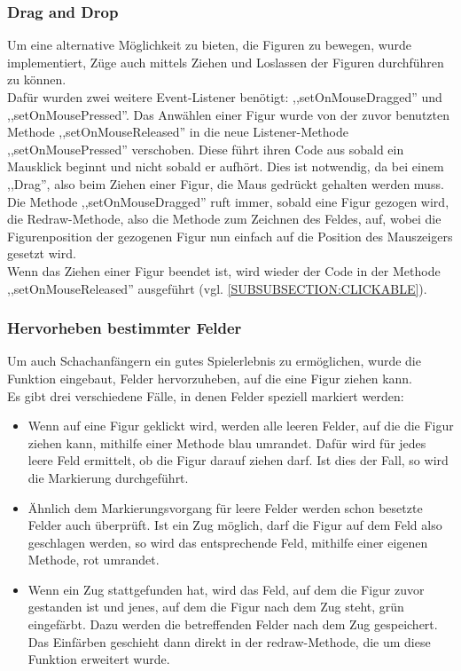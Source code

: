 \documentclass[12pt,a4paper]{article}
\begin{document}
\subsubsection{Drag and Drop}
\label{SUBSUBSECTION:DRAGANDDROP}
Um eine alternative Möglichkeit zu bieten, die Figuren zu bewegen, wurde implementiert, Züge auch mittels Ziehen und Loslassen der Figuren durchführen zu können.\\
Dafür wurden zwei weitere Event-Listener benötigt: ,,setOnMouseDragged'' und \\ ,,setOnMousePressed''. Das Anwählen einer Figur wurde von der zuvor benutzten Methode ,,setOnMouseReleased'' in die neue Listener-Methode ,,setOnMousePressed'' verschoben. Diese führt ihren Code aus sobald ein Mausklick beginnt und nicht sobald er aufhört. Dies ist notwendig, da bei einem ,,Drag'', also beim Ziehen einer Figur, die Maus gedrückt gehalten werden muss.\\
Die Methode ,,setOnMouseDragged'' ruft immer, sobald eine Figur gezogen wird, die Redraw-Methode, also die Methode zum Zeichnen des Feldes, auf, wobei die Figurenposition der gezogenen Figur nun einfach auf die Position des Mauszeigers gesetzt wird.\\
Wenn das Ziehen einer Figur beendet ist, wird wieder der Code in der Methode ,,setOnMouseReleased'' ausgeführt (vgl. \ref{SUBSUBSECTION:CLICKABLE}).


\subsubsection{Hervorheben bestimmter Felder}
\label{SUBSUBSECTION:TILEHIGHLIGHT}
Um auch Schachanfängern ein gutes Spielerlebnis zu ermöglichen, wurde die Funktion eingebaut, Felder hervorzuheben, auf die eine Figur ziehen kann.\\
Es gibt drei verschiedene Fälle, in denen Felder speziell markiert werden: 
\begin{itemize}

\item{Wenn auf eine Figur geklickt wird, werden alle leeren Felder, auf die die Figur ziehen kann, mithilfe einer Methode blau umrandet. Dafür wird für jedes leere Feld ermittelt, ob die Figur darauf ziehen darf. Ist dies der Fall, so wird die Markierung durchgeführt. }

\item{Ähnlich dem Markierungsvorgang für leere Felder werden schon besetzte Felder auch überprüft. Ist ein Zug möglich, darf die Figur auf dem Feld also geschlagen werden, so wird das entsprechende Feld, mithilfe einer eigenen Methode, rot umrandet.}

\item{Wenn ein Zug stattgefunden hat, wird das Feld, auf dem die Figur zuvor gestanden ist und jenes, auf dem die Figur nach dem Zug steht, grün eingefärbt. Dazu werden die betreffenden Felder nach dem Zug gespeichert. Das Einfärben geschieht dann direkt in der redraw-Methode, die um diese Funktion erweitert wurde. }


\end{itemize}
\end{document}

